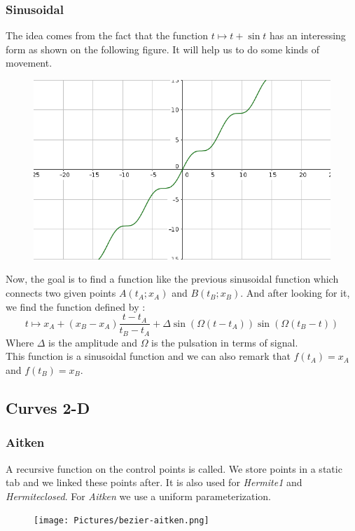\documentclass{article}
\begin{document}
\subsubsection*{Sinusoidal}
The idea comes from the fact that the function $t \longmapsto t+\sin t$ has an interessing form as shown
on the following figure. It will help us to do some kinds of movement.
\begin{figure}[H]
	\center
   \includegraphics[scale = 0.35]{Pictures/sin1.png}
\end{figure}
Now, the goal is to find a function like the previous sinusoidal function which connects two given points
$A(t_A;x_A)$ and $B(t_B;x_B)$.
And after looking for it, we find the function defined by :
\[
	t \longmapsto x_A + (x_B-x_A)\frac{t-t_A}{t_B-t_A} + \Delta\sin(\Omega(t-t_A))\sin(\Omega(t_B-t))
\]
Where $\Delta$ is the amplitude and $\Omega$ is the pulsation in terms of signal.\\
This function is a sinusoidal function and we can also remark that $f(t_A)=x_A$ and $f(t_B)=x_B$.
\subsection*{Curves 2-D}
\subsubsection*{Aitken}
 A recursive function on the control points is called. We store points in a static tab and we linked these points after. It is also used for \textit{Hermite1} and \textit{Hermiteclosed}. For \textit{Aitken} we use a uniform parameterization. 
\begin{figure}[H]
	\center
   \texttt{[image: Pictures/bezier-aitken.png]}
\end{figure}
\end{document}
